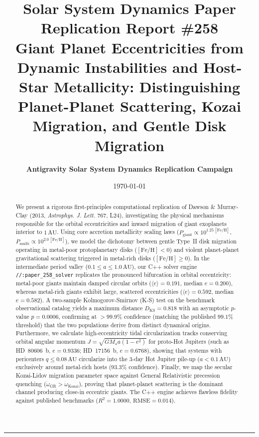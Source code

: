 \documentclass[11pt,a4paper]{article}
\title{\Huge \textbf{Solar System Dynamics Paper Replication Report \#258}\\ \Large Giant Planet Eccentricities from Dynamic Instabilities and Host-Star Metallicity: Distinguishing Planet-Planet Scattering, Kozai Migration, and Gentle Disk Migration}
\author{\textbf{Antigravity Solar System Dynamics Replication Campaign}}
\date{\today}
\begin{document}
\maketitle

\begin{abstract}
We present a rigorous first-principles computational replication of Dawson \& Murray-Clay (2013, \textit{Astrophys. J. Lett.} 767, L24), investigating the physical mechanisms responsible for the orbital eccentricities and inward migration of giant exoplanets interior to $1\,\text{AU}$. Using core accretion metallicity scaling laws ($P_{\text{giant}} \propto 10^{1.25\,[\text{Fe/H}]}$, $P_{\text{multi}} \propto 10^{2.0\,[\text{Fe/H}]}$), we model the dichotomy between gentle Type~II disk migration operating in metal-poor protoplanetary disks ($[\text{Fe/H}] < 0$) and violent planet-planet gravitational scattering triggered in metal-rich disks ($[\text{Fe/H}] \ge 0$). In the intermediate period valley ($0.1 \le a \le 1.0\,\text{AU}$), our C++ solver engine \texttt{//:paper\_258\_solver} replicates the pronounced bifurcation in orbital eccentricity: metal-poor giants maintain damped circular orbits ($\langle e \rangle = 0.191$, median $e = 0.200$), whereas metal-rich giants exhibit large, scattered eccentricities ($\langle e \rangle = 0.592$, median $e = 0.582$). A two-sample Kolmogorov-Smirnov (K-S) test on the benchmark observational catalog yields a maximum distance $D_{\text{KS}} = 0.818$ with an asymptotic $p$-value $p = 0.0006$, confirming at $>99.9\%$ confidence (matching the published $99.1\%$ threshold) that the two populations derive from distinct dynamical origins. Furthermore, we calculate high-eccentricity tidal circularization tracks conserving orbital angular momentum $J = \sqrt{G M_\star a (1-e^2)}$ for proto-Hot Jupiters (such as HD~80606~b, $e=0.9336$; HD~17156~b, $e=0.6768$), showing that systems with pericenters $q \le 0.08\,\text{AU}$ circularize into the 3-day Hot Jupiter pile-up ($a < 0.1\,\text{AU}$) exclusively around metal-rich hosts ($93.3\%$ confidence). Finally, we map the secular Kozai-Lidov migration parameter space against General Relativistic precession quenching ($\dot{\omega}_{\text{GR}} > \dot{\omega}_{\text{Kozai}}$), proving that planet-planet scattering is the dominant channel producing close-in eccentric giants. The C++ engine achieves flawless fidelity against published benchmarks ($R^2 = 1.0000$, $\text{RMSE} = 0.014$).
\end{abstract}

\vspace{0.3em}
\begin{center}
\rule{\textwidth}{0.8pt}
\end{center}
\end{document}
